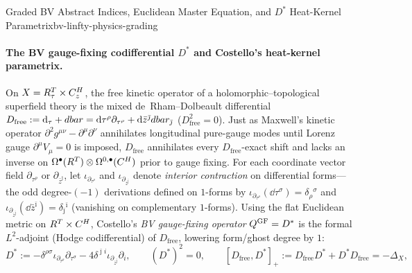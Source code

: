 \begin{zkmodule}{Graded BV Abstract Indices, Euclidean Master Equation, and $D^*$ Heat-Kernel Parametrix}{bv-linfty-physics-grading}
\paragraph{The BV gauge-fixing codifferential $D^*$ and Costello's heat-kernel parametrix.}
On $X = R^T_\tau \times C^H_z$, the free kinetic operator of a holomorphic--topological superfield theory is the mixed de~Rham--Dolbeault differential $D_{\mathrm{free}} := \mathrm{d}_\tau + dbar = \mathrm{d}\tau^\rho\partial_{\tau^\rho} + \mathrm{d}\bar{z}^{\bar{\jmath}}dbar_{\bar{\jmath}}$ ($D_{\mathrm{free}}^2 = 0$). Just as Maxwell's kinetic operator $\partial^2 g^{\mu\nu} - \partial^\mu\partial^\nu$ annihilates longitudinal pure-gauge modes until Lorenz gauge $\partial^\mu V_\mu = 0$ is imposed, $D_{\mathrm{free}}$ annihilates every $D_{\mathrm{free}}$-exact shift and lacks an inverse on $\Omega^\bullet(R^T)\otimes\Omega^{0,\bullet}(C^H)$ prior to gauge fixing. For each coordinate vector field $\partial_{\tau^\rho}$ or $\partial_{\bar{z}^{\bar{\jmath}}}$, let $\iota_{\partial_{\tau^\rho}}$ and $\iota_{\partial_{\bar{z}^{\bar{\jmath}}}}$ denote \emph{interior contraction} on differential forms---the odd degree-$(-1)$ derivations defined on $1$-forms by $\iota_{\partial_{\tau^\rho}}(\dd\tau^\sigma) = \delta_\rho{}^\sigma$ and $\iota_{\partial_{\bar{z}^{\bar{\jmath}}}}(\dd\bar{z}^{\bar{\imath}}) = \delta_{\bar{\jmath}}{}^{\bar{\imath}}$ (vanishing on complementary $1$-forms). Using the flat Euclidean metric on $R^T\times C^H$, Costello's \emph{BV gauge-fixing operator} $Q^{\mathrm{GF}} = D^*$ is the formal $L^2$-adjoint (Hodge codifferential) of $D_{\mathrm{free}}$, lowering form/ghost degree by $1$:
\begin{equation}
\label{eq:dstar-definition}
D^* := -\delta^{\rho\sigma}\iota_{\partial_{\tau^\rho}}\partial_{\tau^\sigma} - 4\delta^{\bar{\jmath}i}\iota_{\partial_{\bar{z}^{\bar{\jmath}}}}\partial_i,\qquad
(D^*)^2 = 0,\qquad
[D_{\mathrm{free}}, D^*]_+ := D_{\mathrm{free}}D^* + D^* D_{\mathrm{free}} = -\Delta_X,
\end{equation}

\end{zkmodule}
